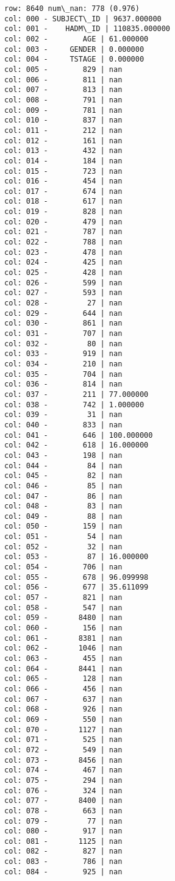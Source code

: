 \documentclass[11pt]{article}
\begin{document}
    \begin{Verbatim}[commandchars=\\\{\}]
row: 8640 num\_nan: 778 (0.976)
col: 000 - SUBJECT\_ID | 9637.000000
col: 001 -    HADM\_ID | 110835.000000
col: 002 -        AGE | 61.000000
col: 003 -     GENDER | 0.000000
col: 004 -     TSTAGE | 0.000000
col: 005 -        829 | nan
col: 006 -        811 | nan
col: 007 -        813 | nan
col: 008 -        791 | nan
col: 009 -        781 | nan
col: 010 -        837 | nan
col: 011 -        212 | nan
col: 012 -        161 | nan
col: 013 -        432 | nan
col: 014 -        184 | nan
col: 015 -        723 | nan
col: 016 -        454 | nan
col: 017 -        674 | nan
col: 018 -        617 | nan
col: 019 -        828 | nan
col: 020 -        479 | nan
col: 021 -        787 | nan
col: 022 -        788 | nan
col: 023 -        478 | nan
col: 024 -        425 | nan
col: 025 -        428 | nan
col: 026 -        599 | nan
col: 027 -        593 | nan
col: 028 -         27 | nan
col: 029 -        644 | nan
col: 030 -        861 | nan
col: 031 -        707 | nan
col: 032 -         80 | nan
col: 033 -        919 | nan
col: 034 -        210 | nan
col: 035 -        704 | nan
col: 036 -        814 | nan
col: 037 -        211 | 77.000000
col: 038 -        742 | 1.000000
col: 039 -         31 | nan
col: 040 -        833 | nan
col: 041 -        646 | 100.000000
col: 042 -        618 | 16.000000
col: 043 -        198 | nan
col: 044 -         84 | nan
col: 045 -         82 | nan
col: 046 -         85 | nan
col: 047 -         86 | nan
col: 048 -         83 | nan
col: 049 -         88 | nan
col: 050 -        159 | nan
col: 051 -         54 | nan
col: 052 -         32 | nan
col: 053 -         87 | 16.000000
col: 054 -        706 | nan
col: 055 -        678 | 96.099998
col: 056 -        677 | 35.611099
col: 057 -        821 | nan
col: 058 -        547 | nan
col: 059 -       8480 | nan
col: 060 -        156 | nan
col: 061 -       8381 | nan
col: 062 -       1046 | nan
col: 063 -        455 | nan
col: 064 -       8441 | nan
col: 065 -        128 | nan
col: 066 -        456 | nan
col: 067 -        637 | nan
col: 068 -        926 | nan
col: 069 -        550 | nan
col: 070 -       1127 | nan
col: 071 -        525 | nan
col: 072 -        549 | nan
col: 073 -       8456 | nan
col: 074 -        467 | nan
col: 075 -        294 | nan
col: 076 -        324 | nan
col: 077 -       8400 | nan
col: 078 -        663 | nan
col: 079 -         77 | nan
col: 080 -        917 | nan
col: 081 -       1125 | nan
col: 082 -        827 | nan
col: 083 -        786 | nan
col: 084 -        925 | nan

\end{Verbatim}
\end{document}
